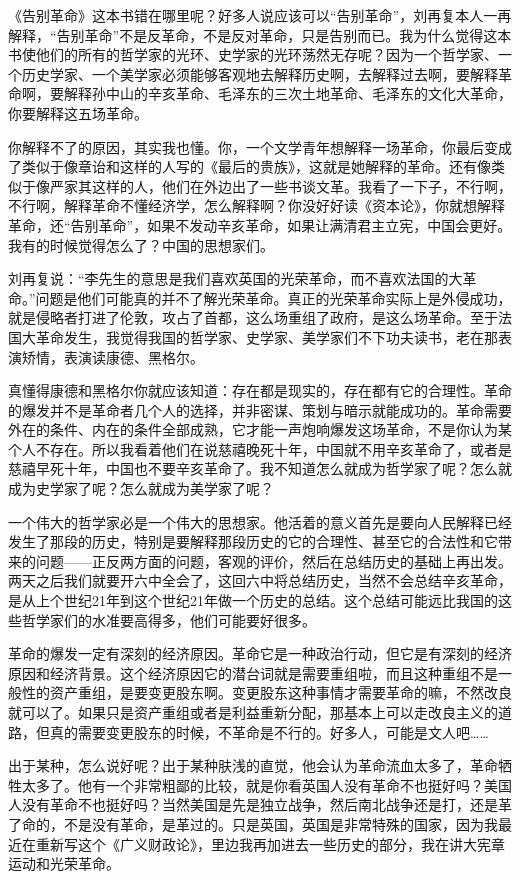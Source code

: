 \documentclass[UTF8, 12pt, a4paper]{ctexrep}
\begin{document}
《告别革命》这本书错在哪里呢？好多人说应该可以“告别革命”，刘再复本人一再解释，“告别革命”不是反革命，不是反对革命，只是告别而已。我为什么觉得这本书使他们的所有的哲学家的光环、史学家的光环荡然无存呢？因为一个哲学家、一个历史学家、一个美学家必须能够客观地去解释历史啊，去解释过去啊，要解释革命啊，要解释孙中山的辛亥革命、毛泽东的三次土地革命、毛泽东的文化大革命，你要解释这五场革命。

你解释不了的原因，其实我也懂。你，一个文学青年想解释一场革命，你最后变成了类似于像章诒和这样的人写的《最后的贵族》，这就是她解释的革命。还有像类似于像严家其这样的人，他们在外边出了一些书谈文革。我看了一下子，不行啊，不行啊，解释革命不懂经济学，怎么解释啊？你没好好读《资本论》，你就想解释革命，还“告别革命”，如果不发动辛亥革命，如果让满清君主立宪，中国会更好。我有的时候觉得怎么了？中国的思想家们。

刘再复说：“李先生的意思是我们喜欢英国的光荣革命，而不喜欢法国的大革命。”问题是他们可能真的并不了解光荣革命。真正的光荣革命实际上是外侵成功，就是侵略者打进了伦敦，攻占了首都，这么场重组了政府，是这么场革命。至于法国大革命发生，我觉得我国的哲学家、史学家、美学家们不下功夫读书，老在那表演矫情，表演读康德、黑格尔。

真懂得康德和黑格尔你就应该知道：存在都是现实的，存在都有它的合理性。革命的爆发并不是革命者几个人的选择，并非密谋、策划与暗示就能成功的。革命需要外在的条件、内在的条件全部成熟，它才能一声炮响爆发这场革命，不是你认为某个人不存在。所以我看着他们在说慈禧晚死十年，中国就不用辛亥革命了，或者是慈禧早死十年，中国也不要辛亥革命了。我不知道怎么就成为哲学家了呢？怎么就成为史学家了呢？怎么就成为美学家了呢？

一个伟大的哲学家必是一个伟大的思想家。他活着的意义首先是要向人民解释已经发生了那段的历史，特别是要解释那段历史的它的合理性、甚至它的合法性和它带来的问题——正反两方面的问题，客观的评价，然后在总结历史的基础上再出发。两天之后我们就要开六中全会了，这回六中将总结历史，当然不会总结辛亥革命，是从上个世纪21年到这个世纪21年做一个历史的总结。这个总结可能远比我国的这些哲学家们的水准要高得多，他们可能要好很多。

革命的爆发一定有深刻的经济原因。革命它是一种政治行动，但它是有深刻的经济原因和经济背景。这个经济原因它的潜台词就是需要重组啦，而且这种重组不是一般性的资产重组，是要变更股东啊。变更股东这种事情才需要革命的嘛，不然改良就可以了。如果只是资产重组或者是利益重新分配，那基本上可以走改良主义的道路，但真的需要变更股东的时候，不革命是不行的。好多人，可能是文人吧……

出于某种，怎么说好呢？出于某种肤浅的直觉，他会认为革命流血太多了，革命牺牲太多了。他有一个非常粗鄙的比较，就是你看英国人没有革命不也挺好吗？美国人没有革命不也挺好吗？当然美国是先是独立战争，然后南北战争还是打，还是革了命的，不是没有革命，是革过的。只是英国，英国是非常特殊的国家，因为我最近在重新写这个《广义财政论》，里边我再加进去一些历史的部分，我在讲大宪章运动和光荣革命。
\end{document}
